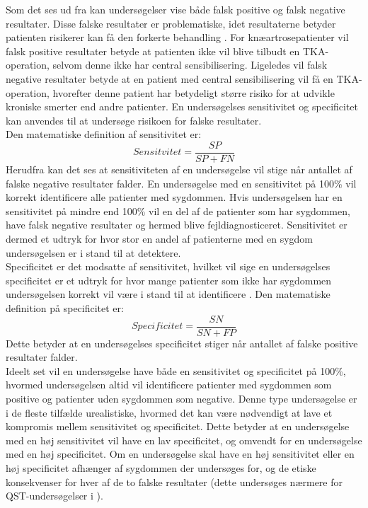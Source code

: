 Som det ses ud fra  kan undersøgelser vise både falsk positive og falsk negative resultater. Disse falske resultater er problematiske, idet resultaterne betyder patienten risikerer kan få den forkerte behandling \citep{Lalkhen2008}. For knæartrosepatienter vil falsk positive resultater betyde at patienten ikke vil blive tilbudt en TKA-operation, selvom denne ikke har central sensibilisering. Ligeledes vil falsk negative resultater betyde at en patient med central sensibilisering vil få en TKA-operation, hvorefter denne patient har betydeligt større risiko for at udvikle kroniske smerter end andre patienter. En undersøgelses sensitivitet og specificitet kan anvendes til at undersøge risikoen for falske resultater. \\
Den matematiske definition af sensitivitet er: \\
\begin{equation}
Sensitvitet=\frac{SP}{SP+FN}
\end{equation}
Herudfra kan det ses at sensitiviteten af en undersøgelse vil stige når antallet af falske negative resultater falder. En undersøgelse med en sensitivitet på 100\% vil korrekt identificere alle patienter med sygdommen. Hvis undersøgelsen har en sensitivitet på mindre end 100\% vil en del af de patienter som har sygdommen, have falsk negative resultater og hermed blive fejldiagnosticeret. Sensitivitet er dermed et udtryk for hvor stor en andel af patienterne med en sygdom undersøgelsen er i stand til at detektere. \citep{Lalkhen2008} \\
Specificitet er det modsatte af sensitivitet, hvilket vil sige en undersøgelses specificitet er et udtryk for hvor mange patienter som ikke har sygdommen undersøgelsen korrekt vil være i stand til at identificere \citep{Lalkhen2008}. Den matematiske definition på specificitet er: \\
\begin{equation}
Specificitet=\frac{SN}{SN+FP}
\end{equation}
Dette betyder at en undersøgelses specificitet stiger når antallet af falske positive resultater falder. \citep{Lalkhen2008} \\
Ideelt set vil en undersøgelse have både en sensitivitet og specificitet på 100\%, hvormed undersøgelsen altid vil identificere patienter med sygdommen som positive og patienter uden sygdommen som negative. Denne type undersøgelse er i de fleste tilfælde urealistiske, hvormed det kan være nødvendigt at lave et kompromis mellem sensitivitet og specificitet. Dette betyder at en undersøgelse med en høj sensitivitet vil have en lav specificitet, og omvendt for en undersøgelse med en høj specificitet. Om en undersøgelse skal have en høj sensitivitet eller en høj specificitet afhænger af sygdommen der undersøges for, og de etiske konsekvenser for hver af de to falske resultater (dette undersøges nærmere for QST-undersøgelser i ). \\
